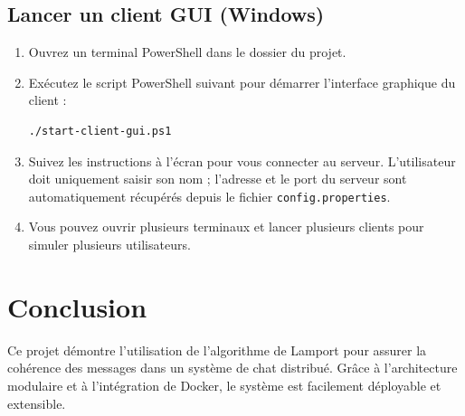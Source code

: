 \documentclass[a4paper,12pt]{article}
\begin{document}
\subsection{Lancer un client GUI (Windows)}
\begin{enumerate}
    \item Ouvrez un terminal PowerShell dans le dossier du projet.
    \item Exécutez le script PowerShell suivant pour démarrer l'interface graphique du client :
    \begin{lstlisting}[language=bash,caption={Démarrage du client GUI sous Windows}]
./start-client-gui.ps1
    \end{lstlisting}
    \item Suivez les instructions à l'écran pour vous connecter au serveur. L'utilisateur doit uniquement saisir son nom ; l'adresse et le port du serveur sont automatiquement récupérés depuis le fichier \texttt{config.properties}.
    \item Vous pouvez ouvrir plusieurs terminaux et lancer plusieurs clients pour simuler plusieurs utilisateurs.
\end{enumerate}

\section{Conclusion}
Ce projet démontre l'utilisation de l'algorithme de Lamport pour assurer la cohérence des messages dans un système de chat distribué. Grâce à l'architecture modulaire et à l'intégration de Docker, le système est facilement déployable et extensible.
\end{document}
